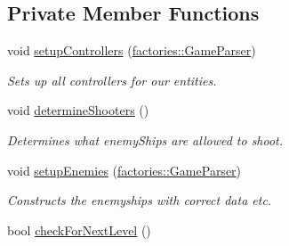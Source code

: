 \subsection*{\-Private \-Member \-Functions}
\begin{DoxyCompactItemize}
\item 
void \hyperlink{classgame_1_1Game_a86da80a17fc023323703faa87994d660}{setup\-Controllers} (\hyperlink{classfactories_1_1GameParser}{factories\-::\-Game\-Parser})
\begin{DoxyCompactList}\small\item\em \-Sets up all controllers for our entities. \end{DoxyCompactList}\item 
void \hyperlink{classgame_1_1Game_afa81ead2ce20ba81e428e4b8fa8e08c4}{determine\-Shooters} ()
\begin{DoxyCompactList}\small\item\em \-Determines what enemy\-Ships are allowed to shoot. \end{DoxyCompactList}\item 
void \hyperlink{classgame_1_1Game_a55d0ed308a08d0c50c89af38932a1dce}{setup\-Enemies} (\hyperlink{classfactories_1_1GameParser}{factories\-::\-Game\-Parser})
\begin{DoxyCompactList}\small\item\em \-Constructs the enemyships with correct data etc. \end{DoxyCompactList}\item 
bool \hyperlink{classgame_1_1Game_a3651fe074f34d0ac51ca4855f8a74c68}{check\-For\-Next\-Level} ()
\end{DoxyCompactItemize}
